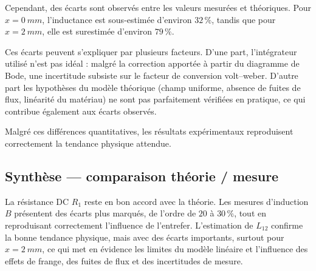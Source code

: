 Cependant, des écarts sont observés entre les valeurs mesurées et théoriques. Pour \(x=\SI{0}{mm}\), l’inductance est sous-estimée d’environ \(32\,\%\), tandis que pour \(x=\SI{2}{mm}\), elle est surestimée d’environ \(79\,\%\).

Ces écarts peuvent s’expliquer par plusieurs facteurs. D’une part, l’intégrateur utilisé n’est pas idéal : malgré la correction apportée à partir du diagramme de Bode, une incertitude subsiste sur le facteur de conversion volt--weber. D’autre part les hypothèses du modèle théorique (champ uniforme, absence de fuites de flux, linéarité du matériau) ne sont pas parfaitement vérifiées en pratique, ce qui contribue également aux écarts observés.

Malgré ces différences quantitatives, les résultats expérimentaux reproduisent correctement la tendance physique attendue.

\subsection{Synthèse — comparaison théorie / mesure}

\begin{table}[H]
\centering
\caption{Tableau de synthèse --- comparaison théorie / mesure}
\footnotesize
{}
\label{tab:comparaison}
\end{table}

\noindent La résistance DC \(R_1\) reste en bon accord avec la théorie. Les mesures d'induction \(B\) présentent des écarts plus marqués, de l'ordre de \(20\) à \(30\,\%\), tout en reproduisant correctement l'influence de l'entrefer. L'estimation de \(L_{12}\) confirme la bonne tendance physique, mais avec des écarts importants, surtout pour \(x=\SI{2}{mm}\), ce qui met en évidence les limites du modèle linéaire et l'influence des effets de frange, des fuites de flux et des incertitudes de mesure.
